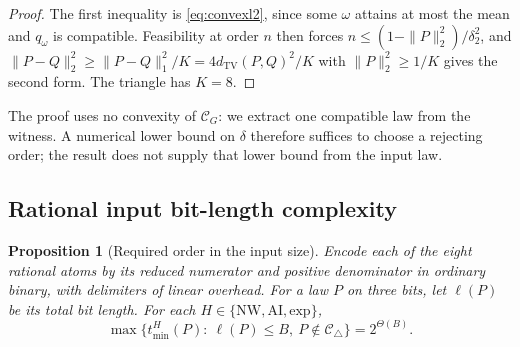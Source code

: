 \documentclass[11pt]{article}
\theoremstyle{plain}
\newtheorem{proposition}[theorem]{Proposition}
\theoremstyle{definition}
\DeclareMathOperator{\TV}{TV}
\newcommand{\Ctri}{\mathcal C_{\triangle}}
\newcommand{\tmin}{t_{\min}}
\begin{document}
\begin{proof}
The first inequality is \eqref{eq:convexl2}, since some $\omega$ attains at most the mean and $q_\omega$ is compatible. Feasibility at order $n$ then forces $n\le(1-\|P\|_2^2)/\delta_2^2$, and $\|P-Q\|_2^2\ge\|P-Q\|_1^2/K=4d_{\TV}(P,Q)^2/K$ with $\|P\|_2^2\ge1/K$ gives the second form. The triangle has $K=8$.
\end{proof}

The proof uses no convexity of $\mathcal C_G$: we extract one compatible law from the witness. A numerical lower bound on $\delta$ therefore suffices to choose a rejecting order; the result does not supply that lower bound from the input law.

\subsection{Rational input bit-length complexity}\label{sec:bits}

\begin{proposition}[Required order in the input size]\label{prop:bits}
Encode each of the eight rational atoms by its reduced numerator and positive denominator in ordinary binary, with delimiters of linear overhead. For a law $P$ on three bits, let $\ell(P)$ be its total bit length. For each $H\in\{\mathrm{NW},\mathrm{AI},\mathrm{exp}\}$,
\[
\max\bigl\{\tmin^H(P):\ \ell(P)\le B,\ P\notin\Ctri\bigr\}=2^{\Theta(B)} .
\]
\end{proposition}
\end{document}
